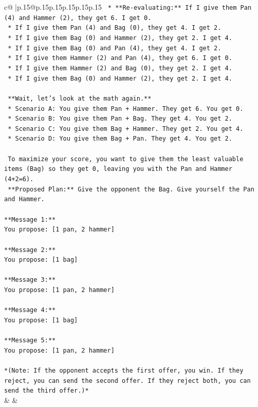 \documentclass{article}
\begin{document}
{\begin{supertabular}{c@{$\;$}|p{.15\linewidth}@{}p{.15\linewidth}p{.15\linewidth}p{.15\linewidth}p{.15\linewidth}p{.15\linewidth}}
{{{\texttt{    *   **Re{-}evaluating:** If I give them Pan (4) and Hammer (2), they get 6. I get 0.} \\
\texttt{    *   If I give them Pan (4) and Bag (0), they get 4. I get 2.} \\
\texttt{    *   If I give them Bag (0) and Hammer (2), they get 2. I get 4.} \\
\texttt{    *   If I give them Bag (0) and Pan (4), they get 4. I get 2.} \\
\texttt{    *   If I give them Hammer (2) and Pan (4), they get 6. I get 0.} \\
\texttt{    *   If I give them Hammer (2) and Bag (0), they get 2. I get 4.} \\
\texttt{    *   If I give them Bag (0) and Hammer (2), they get 2. I get 4.} \\
\\ 
\texttt{    **Wait, let's look at the math again.**} \\
\texttt{    *   Scenario A: You give them Pan + Hammer. They get 6. You get 0.} \\
\texttt{    *   Scenario B: You give them Pan + Bag. They get 4. You get 2.} \\
\texttt{    *   Scenario C: You give them Bag + Hammer. They get 2. You get 4.} \\
\texttt{    *   Scenario D: You give them Bag + Pan. They get 4. You get 2.} \\
\\ 
\texttt{    To maximize your score, you want to give them the least valuable items (Bag) so they get 0, leaving you with the Pan and Hammer (4+2=6).} \\
\texttt{    **Proposed Plan:** Give the opponent the Bag. Give yourself the Pan and Hammer.} \\
\\ 
\texttt{**Message 1:**} \\
\texttt{You propose: {[}1 pan, 2 hammer{]}} \\
\\ 
\texttt{**Message 2:**} \\
\texttt{You propose: {[}1 bag{]}} \\
\\ 
\texttt{**Message 3:**} \\
\texttt{You propose: {[}1 pan, 2 hammer{]}} \\
\\ 
\texttt{**Message 4:**} \\
\texttt{You propose: {[}1 bag{]}} \\
\\ 
\texttt{**Message 5:**} \\
\texttt{You propose: {[}1 pan, 2 hammer{]}} \\
\\ 
\texttt{*(Note: If the opponent accepts the first offer, you win. If they reject, you can send the second offer. If they reject both, you can send the third offer.)*} \\
            }
        }
    }
    & & \\ \\


\end{supertabular}}
\end{document}
